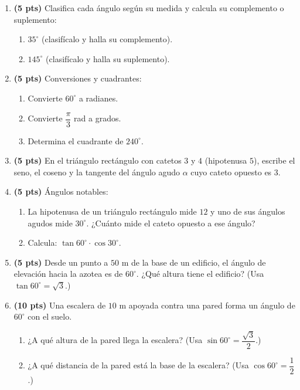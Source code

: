 \documentclass[12pt, letterpaper]{article}
\providecommand{\sen}{\sin}
\begin{document}
\begin{enumerate}[leftmargin=*]
  \item \textbf{(5 pts)} Clasifica cada ángulo según su medida y calcula su complemento o suplemento:
        \begin{enumerate}[label=\alph*)]
          \item $35^{\circ}$ (clasifícalo y halla su complemento).
          \item $145^{\circ}$ (clasifícalo y halla su suplemento).
        \end{enumerate}

  \item \textbf{(5 pts)} Conversiones y cuadrantes:
        \begin{enumerate}[label=\alph*)]
          \item Convierte $60^{\circ}$ a radianes.
          \item Convierte $\dfrac{\pi}{3}$ rad a grados.
          \item Determina el cuadrante de $240^{\circ}$.
        \end{enumerate}

  \item \textbf{(5 pts)} En el triángulo rectángulo con catetos $3$ y $4$ (hipotenusa $5$), escribe el seno, el coseno y la tangente del ángulo agudo $\alpha$ cuyo cateto opuesto es $3$.

  \item \textbf{(5 pts)} Ángulos notables:
        \begin{enumerate}[label=\alph*)]
          \item La hipotenusa de un triángulo rectángulo mide $12$ y uno de sus ángulos agudos mide $30^{\circ}$. ¿Cuánto mide el cateto opuesto a ese ángulo?
          \item Calcula: $\tan 60^{\circ} \cdot \cos 30^{\circ}$.
        \end{enumerate}

  \item \textbf{(5 pts)} Desde un punto a $50$ m de la base de un edificio, el ángulo de elevación hacia la azotea es de $60^{\circ}$. ¿Qué altura tiene el edificio? (Usa $\tan 60^{\circ} = \sqrt{3}$.)

  \item \textbf{(10 pts)} Una escalera de $10$ m apoyada contra una pared forma un ángulo de $60^{\circ}$ con el suelo.
        \begin{enumerate}[label=\alph*)]
          \item ¿A qué altura de la pared llega la escalera? (Usa $\sen 60^{\circ} = \dfrac{\sqrt{3}}{2}$.)
          \item ¿A qué distancia de la pared está la base de la escalera? (Usa $\cos 60^{\circ} = \dfrac{1}{2}$.)
        \end{enumerate}
\end{enumerate}
\end{document}
